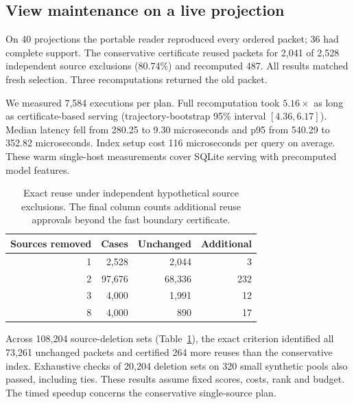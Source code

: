 \documentclass[conference]{IEEEtran}
\begin{document}
\subsection{View maintenance on a live projection}
On 40 projections the portable reader reproduced every ordered packet; 36 had complete support. The conservative certificate reused packets for 2,041 of 2,528 independent source exclusions (80.74\%) and recomputed 487. All results matched fresh selection. Three recomputations returned the old packet.

We measured 7,584 executions per plan. Full recomputation took $5.16\times$ as long as certificate-based serving (trajectory-bootstrap 95\% interval $[4.36,6.17]$). Median latency fell from 280.25 to 9.30 microseconds and p95 from 540.29 to 352.82 microseconds. Index setup cost 116 microseconds per query on average. These warm single-host measurements cover SQLite serving with precomputed model features. 

\balance
\begin{table}[t]
\caption{Exact reuse under independent hypothetical source exclusions. The final column counts additional reuse approvals beyond the fast boundary certificate.}
\centering\small
\begin{tabular}{rrrr}\toprule
Sources removed & Cases & Unchanged & Additional\\\midrule
1 & 2,528 & 2,044 & 3\\
2 & 97,676 & 68,336 & 232\\
3 & 4,000 & 1,991 & 12\\
8 & 4,000 & 890 & 17\\
\bottomrule\end{tabular}
\label{tab:exclusions}
\end{table}

Across 108,204 source-deletion sets (Table~\ref{tab:exclusions}), the exact criterion identified all 73,261 unchanged packets and certified 264 more reuses than the conservative index. Exhaustive checks of 20,204 deletion sets on 320 small synthetic pools also passed, including ties. These results assume fixed scores, costs, rank and budget. The timed speedup concerns the conservative single-source plan.
\end{document}
